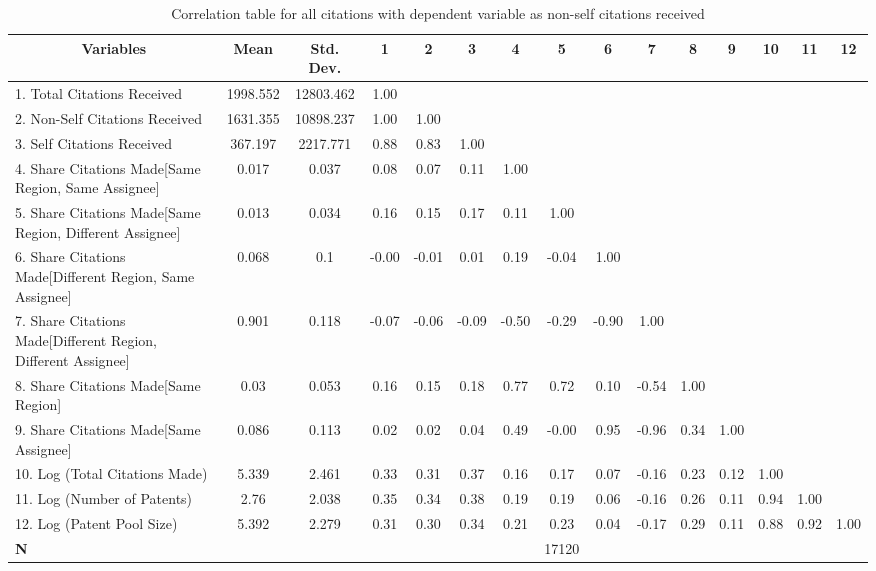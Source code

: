 \begin{table}[htbp]\centering \caption{Correlation table for all citations  with dependent variable as non-self citations received\label{a.e.o.t.n.ncorrelation}}
\scriptsize
\onehalfspacing
\begin{adjustbox}{angle=90}
\begin{tabular}{l  c  c  c  c  c  c  c  c  c  c  c  c  c  c }\hline\hline
\multicolumn{1}{c}{Variables} & \textbf{Mean}& \textbf{Std. Dev.}&1&2&3&4&5&6&7&8&9&10&11&12\\ \hline
1. Total Citations Received & 1998.552 & 12803.462&1.00\\
2. Non-Self Citations Received& 1631.355 & 10898.237&1.00&1.00\\
3. Self Citations Received& 367.197 & 2217.771&0.88&0.83&1.00\\
4. Share Citations Made[Same Region, Same Assignee]& 0.017 & 0.037&0.08&0.07&0.11&1.00\\
5. Share Citations Made[Same Region, Different Assignee]& 0.013 & 0.034&0.16&0.15&0.17&0.11&1.00\\
6. Share Citations Made[Different Region, Same Assignee]& 0.068 & 0.1 &-0.00&-0.01&0.01&0.19&-0.04&1.00\\
7. Share Citations Made[Different Region, Different Assignee]& 0.901 & 0.118&-0.07&-0.06&-0.09&-0.50&-0.29&-0.90&1.00\\
8. Share Citations Made[Same Region]& 0.03 & 0.053&0.16&0.15&0.18&0.77&0.72&0.10&-0.54&1.00\\
9. Share Citations Made[Same Assignee] & 0.086 & 0.113&0.02&0.02&0.04&0.49&-0.00&0.95&-0.96&0.34&1.00\\
10. Log (Total Citations Made) & 5.339 & 2.461  &0.33&0.31&0.37&0.16&0.17&0.07&-0.16&0.23&0.12&1.00\\
11. Log (Number of Patents)& 2.76 & 2.038 &0.35&0.34&0.38&0.19&0.19&0.06&-0.16&0.26&0.11&0.94&1.00\\
12. Log (Patent Pool Size) & 5.392 & 2.279&0.31&0.30&0.34&0.21&0.23&0.04&-0.17&0.29&0.11&0.88&0.92&1.00\\
\hline
\textbf{N}&&&&&&&17120\\
\hline \hline 
 \end{tabular}
 \end{adjustbox}
\end{table}
